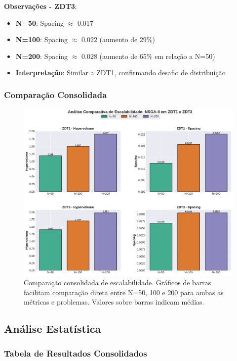 \textbf{Observações - ZDT3}:
\begin{itemize}
    \item \textbf{N=50}: Spacing $\approx$ 0.017
    \item \textbf{N=100}: Spacing $\approx$ 0.022 (aumento de 29\%)
    \item \textbf{N=200}: Spacing $\approx$ 0.028 (aumento de 65\% em relação a N=50)
    \item \textbf{Interpretação}: Similar a ZDT1, confirmando desafio de distribuição
\end{itemize}

\subsubsection{Comparação Consolidada}

\begin{figure}[H]
    \centering
    \includegraphics[width=\textwidth]{../plots/K_combined_nvar_comparison.pdf}
    \caption{Comparação consolidada de escalabilidade. Gráficos de barras facilitam comparação direta entre N=50, 100 e 200 para ambas as métricas e problemas. Valores sobre barras indicam médias.}
    \label{fig:combined_nvar}
\end{figure}

\subsection{Análise Estatística}

\subsubsection{Tabela de Resultados Consolidados}

